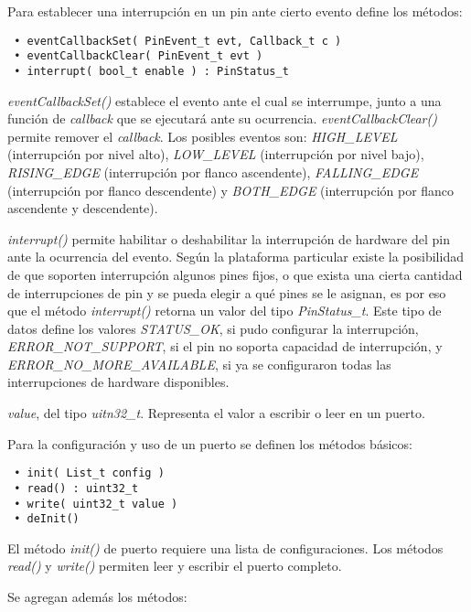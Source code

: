 Para establecer una interrupción en un pin ante cierto evento define los métodos: 

\begin{verbatim}
 • eventCallbackSet( PinEvent_t evt, Callback_t c )
 • eventCallbackClear( PinEvent_t evt )
 • interrupt( bool_t enable ) : PinStatus_t
\end{verbatim} 

\emph{eventCallbackSet()} establece el evento ante el cual se interrumpe, junto a una función de \emph{callback} que se ejecutará ante su ocurrencia. \emph{eventCallbackClear()} permite remover el \emph{callback}. Los posibles eventos son: \emph{HIGH\_LEVEL} (interrupción por nivel alto), \emph{LOW\_LEVEL} (interrupción por nivel bajo), \emph{RISING\_EDGE} (interrupción por flanco ascendente), \emph{FALLING\_EDGE} (interrupción por flanco descendente) y \emph{BOTH\_EDGE} (interrupción por flanco ascendente y descendente). 

\emph{interrupt()} permite habilitar o deshabilitar la interrupción de hardware del pin ante la ocurrencia del evento. Según la plataforma particular existe la posibilidad de que soporten interrupción algunos pines fijos, o que exista una cierta cantidad de interrupciones de pin y se pueda elegir a qué pines se le asignan, es por eso que el método \emph{interrupt()} retorna un valor del tipo \emph{PinStatus\_t}. Este tipo de datos define los valores \emph{STATUS\_OK}, si pudo configurar la interrupción, \emph{ERROR\_NOT\_SUPPORT}, si el pin no soporta capacidad de interrupción, y \emph{ERROR\_NO\_MORE\_AVAILABLE}, si ya se configuraron todas las interrupciones de hardware disponibles. 


\emph{value}, del tipo \emph{uitn32\_t}. Representa el valor a escribir o leer en un puerto.


Para la configuración y uso de un puerto se definen los métodos básicos:

\begin{verbatim}
 • init( List_t config )
 • read() : uint32_t
 • write( uint32_t value )
 • deInit()
\end{verbatim}

El método \emph{init()} de puerto requiere una lista de configuraciones. Los métodos \emph{read()} y \emph{write()} permiten leer y escribir el puerto completo.

Se agregan además los métodos:

